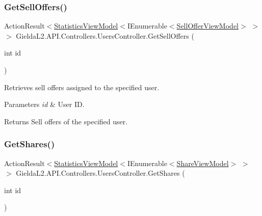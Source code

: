 \subsubsection{\texorpdfstring{GetSellOffers()}{GetSellOffers()}}
{\footnotesize\ttfamily Action\+Result$<$\mbox{\hyperlink{class_gielda_l2_1_1_a_p_i_1_1_view_models_1_1_view_1_1_statistics_view_model}{Statistics\+View\+Model}}$<$I\+Enumerable$<$\mbox{\hyperlink{class_gielda_l2_1_1_a_p_i_1_1_view_models_1_1_view_1_1_sell_offer_view_model}{Sell\+Offer\+View\+Model}}$>$ $>$ $>$ Gielda\+L2.\+A\+P\+I.\+Controllers.\+Users\+Controller.\+Get\+Sell\+Offers (\begin{DoxyParamCaption}\item[{int}]{id }\end{DoxyParamCaption})}



Retrieves sell offers assigned to the specified user. 


\begin{DoxyParams}{Parameters}
{\em id} & User ID.\\
\hline
\end{DoxyParams}
\begin{DoxyReturn}{Returns}
Sell offers of the specified user.
\end{DoxyReturn}
\mbox{\label{class_gielda_l2_1_1_a_p_i_1_1_controllers_1_1_users_controller_adbf0440fe0cc3b28ce771a1808e21d8c}} 
\subsubsection{\texorpdfstring{GetShares()}{GetShares()}}
{\footnotesize\ttfamily Action\+Result$<$\mbox{\hyperlink{class_gielda_l2_1_1_a_p_i_1_1_view_models_1_1_view_1_1_statistics_view_model}{Statistics\+View\+Model}}$<$I\+Enumerable$<$\mbox{\hyperlink{class_gielda_l2_1_1_a_p_i_1_1_view_models_1_1_view_1_1_share_view_model}{Share\+View\+Model}}$>$ $>$ $>$ Gielda\+L2.\+A\+P\+I.\+Controllers.\+Users\+Controller.\+Get\+Shares (\begin{DoxyParamCaption}\item[{int}]{id }\end{DoxyParamCaption})}



